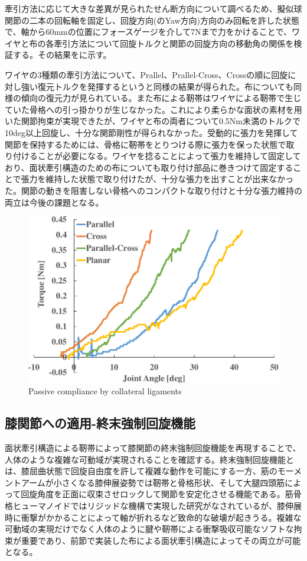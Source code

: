 \documentclass{jarticle}
\begin{document}
牽引方法に応じて大きな差異が見られたせん断方向について調べるため、擬似球関節の二本の回転軸を固定し、回旋方向(のYaw方向)方向のみ回転を許した状態で、軸から60mmの位置にフォースゲージを介して7Nまで力をかけることで、ワイヤと布の各牽引方法について回旋トルクと関節の回旋方向の移動角の関係を検証する。その結果をに示す。

ワイヤの3種類の牽引方法について、Prallel、Prallel-Cross、Crossの順に回旋に対し強い復元トルクを発揮するというと同様の結果が得られた。布についても同様の傾向の復元力が見られている。また布による靭帯はワイヤによる靭帯で生じていた骨格への引っ掛かりが生じなかった。これにより柔らかな面状の素材を用いた関節拘束が実現できたが、ワイヤと布の両者について0.5Nm未満のトルクで10deg以上回旋し、十分な関節剛性が得られなかった。受動的に張力を発揮して関節を保持するためには、骨格に靭帯をとりつける際に張力を保った状態で取り付けることが必要になる。ワイヤを捻ることによって張力を維持して固定しており、面状牽引構造のための布についても取り付け部品に巻きつけて固定することで張力を維持した状態で取り付けたが、十分な張力を出すことが出来なかった。関節の動きを阻害しない骨格へのコンパクトな取り付けと十分な張力維持の両立は今後の課題となる。

\begin{figure}[tb]
 \centering
 \includegraphics[width=0.9\columnwidth]{figs/passive-compliance.pdf}
  \vspace*{-4mm}
  \caption{Passive compliance by collateral ligaments}
  \label{fig:passive-compliance}
\end{figure}

\subsection{膝関節への適用-終末強制回旋機能}
面状牽引構造による靭帯によって膝関節の終末強制回旋機能を再現することで、人体のような複雑な可動域が実現されることを確認する。終末強制回旋機能とは、膝屈曲状態で回旋自由度を許して複雑な動作を可能にする一方、筋のモーメントアームが小さくなる膝伸展姿勢では靭帯と骨格形状、そして大腿四頭筋によって回旋角度を正面に収束させロックして関節を安定化させる機能である。筋骨格ヒューマノイドではリジッドな機構で実現した研究\cite{IROS2013:asano:knee}がなされているが、膝伸展時に衝撃がかかることによって軸が折れるなど致命的な破壊が起きうる。複雑な可動域の実現だけでなく人体のように腱や靭帯による衝撃吸収可能なソフトな拘束が重要であり、前節で実装した布による面状牽引構造によってその両立が可能となる。
\end{document}
